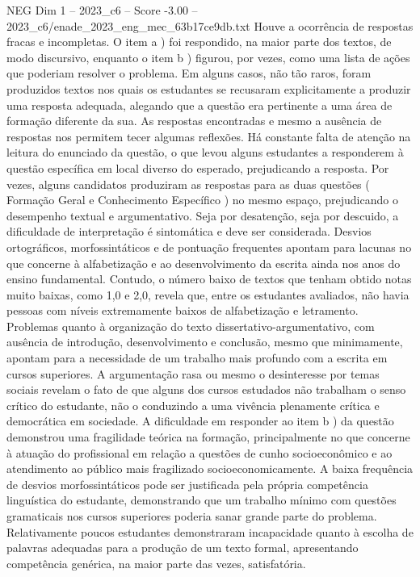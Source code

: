 \begin{textsample}{NEG Dim 1 – 2023\_c6 – Score -3.00 – 2023\_c6/enade\_2023\_eng\_mec\_63b17ce9db.txt}
Houve a ocorrência de respostas fracas e incompletas.
O item a ) foi respondido, na maior parte dos textos, de modo discursivo, enquanto o item b ) figurou, por vezes, como uma lista de ações que poderiam resolver o problema.
Em alguns casos, não tão raros, foram produzidos textos nos quais os estudantes se recusaram explicitamente a produzir uma resposta adequada, alegando que a questão era pertinente a uma área de formação diferente da sua.
As respostas encontradas e mesmo a ausência de respostas nos permitem tecer algumas reflexões.
Há constante falta de atenção na leitura do enunciado da questão, o que levou alguns estudantes a responderem à questão específica em local diverso do esperado, prejudicando a resposta.
Por vezes, alguns candidatos produziram as respostas para as duas questões ( Formação Geral e Conhecimento Específico ) no mesmo espaço, prejudicando o desempenho textual e argumentativo.
Seja por desatenção, seja por descuido, a dificuldade de interpretação é sintomática e deve ser considerada.
Desvios ortográficos, morfossintáticos e de pontuação frequentes apontam para lacunas no que concerne à alfabetização e ao desenvolvimento da escrita ainda nos anos do ensino fundamental.
Contudo, o número baixo de textos que tenham obtido notas muito baixas, como 1,0 e 2,0, revela que, entre os estudantes avaliados, não havia pessoas com níveis extremamente baixos de alfabetização e letramento.
Problemas quanto à organização do texto dissertativo-argumentativo, com ausência de introdução, desenvolvimento e conclusão, mesmo que minimamente, apontam para a necessidade de um trabalho mais profundo com a escrita em cursos superiores.
A argumentação rasa ou mesmo o desinteresse por temas sociais revelam o fato de que alguns dos cursos estudados não trabalham o senso crítico do estudante, não o conduzindo a uma vivência plenamente crítica e democrática em sociedade.
A dificuldade em responder ao item b ) da questão demonstrou uma fragilidade teórica na formação, principalmente no que concerne à atuação do profissional em relação a questões de cunho socioeconômico e ao atendimento ao público mais fragilizado socioeconomicamente.
A baixa frequência de desvios morfossintáticos pode ser justificada pela própria competência linguística do estudante, demonstrando que um trabalho mínimo com questões gramaticais nos cursos superiores poderia sanar grande parte do problema.
Relativamente poucos estudantes demonstraram incapacidade quanto à escolha de palavras adequadas para a produção de um texto formal, apresentando competência genérica, na maior parte das vezes, satisfatória.

\end{textsample}
